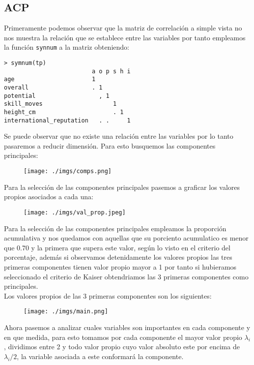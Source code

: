 \documentclass[a4paper,10pt,twocolumn]{article}
\begin{document}
\subsection*{ACP}

Primeramente podemos observar que la matriz de correlaci\'on a simple vista no nos muestra la relaci\'on que se establece entre las variables por tanto empleamos la funci\'on \verb|synnum| a la matriz obteniendo:
\newline
\begin{verbatim}
> symnum(tp)
                         a o p s h i
age                      1          
overall                  . 1        
potential                  , 1      
skill_moves                    1    
height_cm                      . 1  
international_reputation   . .     1
\end{verbatim}

Se puede observar que no existe una relaci\'on entre las variables por lo tanto pasaremos a reducir dimensi\'on. Para esto busquemos las componentes principales:

\begin{figure}[h]
	\texttt{[image: ./imgs/comps.png]}
\end{figure}

Para la selecci\'on de las componentes principales pasemos a graficar los valores propios asociados a cada una:

\begin{figure}[h]
	\texttt{[image: ./imgs/val\_prop.jpeg]}
\end{figure}

Para la selecci\'on de las componentes principales empleamos la proporci\'on acumulativa y nos quedamos con aquellas que su porciento acumulatico es menor que 0.70 y la primera que supera este valor, seg\'un lo visto en el criterio del porcentaje, adem\'as si observamos detenidamente los valores propios las tres primeras componentes tienen valor propio mayor a 1 por tanto si hubieramos seleccionado el criterio de Kaiser obtendriamos las 3 primeras componentes como principales.\\
Los valores propios de las 3 primeras componentes son los siguientes:

\begin{figure}[h]
	\texttt{[image: ./imgs/main.png]}
\end{figure}

Ahora pasemos a analizar cuales variables son importantes en cada componente y en que medida, para esto tomamos por cada componente el mayor valor propio $\lambda_i$, dividimos entre 2 y todo valor propio cuyo valor absoluto este por encima de $\lambda_i / 2$, la variable asociada a este conformar\'a la componente.
\end{document}
